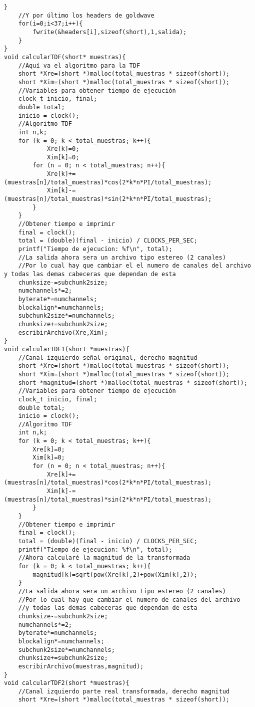 \begin{lstlisting}[style=CStyle]
	}
	//Y por último los headers de goldwave
	for(i=0;i<37;i++){
		fwrite(&headers[i],sizeof(short),1,salida);
	}
}
void calcularTDF(short* muestras){
	//Aquí va el algoritmo para la TDF
	short *Xre=(short *)malloc(total_muestras * sizeof(short));
	short *Xim=(short *)malloc(total_muestras * sizeof(short));
	//Variables para obtener tiempo de ejecución
	clock_t inicio, final;
	double total;
	inicio = clock();
	//Algoritmo TDF
	int n,k;
	for (k = 0; k < total_muestras; k++){
			Xre[k]=0;
			Xim[k]=0;
		for (n = 0; n < total_muestras; n++){
			Xre[k]+=(muestras[n]/total_muestras)*cos(2*k*n*PI/total_muestras);
			Xim[k]-=(muestras[n]/total_muestras)*sin(2*k*n*PI/total_muestras);
		}	
	}
	//Obtener tiempo e imprimir
	final = clock();
	total = (double)(final - inicio) / CLOCKS_PER_SEC;
	printf("Tiempo de ejecucion: %f\n", total);
	//La salida ahora sera un archivo tipo estereo (2 canales)
	//Por lo cual hay que cambiar el el numero de canales del archivo y todas las demas cabeceras que dependan de esta
	chunksize-=subchunk2size;
	numchannels*=2;
	byterate*=numchannels;
	blockalign*=numchannels;
	subchunk2size*=numchannels;
	chunksize+=subchunk2size;
	escribirArchivo(Xre,Xim);
}
void calcularTDF1(short *muestras){
	//Canal izquierdo señal original, derecho magnitud
	short *Xre=(short *)malloc(total_muestras * sizeof(short));
	short *Xim=(short *)malloc(total_muestras * sizeof(short));
	short *magnitud=(short *)malloc(total_muestras * sizeof(short));
	//Variables para obtener tiempo de ejecución
	clock_t inicio, final;
	double total;
	inicio = clock();
	//Algoritmo TDF
	int n,k;
	for (k = 0; k < total_muestras; k++){
		Xre[k]=0;
		Xim[k]=0;
		for (n = 0; n < total_muestras; n++){
			Xre[k]+=(muestras[n]/total_muestras)*cos(2*k*n*PI/total_muestras);
			Xim[k]-=(muestras[n]/total_muestras)*sin(2*k*n*PI/total_muestras);
		}
	}
	//Obtener tiempo e imprimir
	final = clock();
	total = (double)(final - inicio) / CLOCKS_PER_SEC;
	printf("Tiempo de ejecucion: %f\n", total);
	//Ahora calcularé la magnitud de la transformada
	for (k = 0; k < total_muestras; k++){
		magnitud[k]=sqrt(pow(Xre[k],2)+pow(Xim[k],2));
	}
	//La salida ahora sera un archivo tipo estereo (2 canales)
	//Por lo cual hay que cambiar el numero de canales del archivo 
	//y todas las demas cabeceras que dependan de esta
	chunksize-=subchunk2size;
	numchannels*=2;
	byterate*=numchannels;
	blockalign*=numchannels;
	subchunk2size*=numchannels;
	chunksize+=subchunk2size;
	escribirArchivo(muestras,magnitud);
}
void calcularTDF2(short *muestras){
	//Canal izquierdo parte real transformada, derecho magnitud
	short *Xre=(short *)malloc(total_muestras * sizeof(short));

\end{lstlisting}
